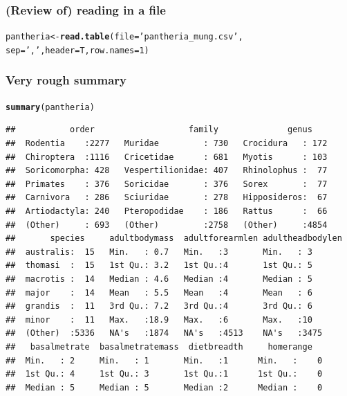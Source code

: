 \documentclass{beamer}\usepackage{graphicx, color}
\makeatletter
\newcommand{\hlfunctioncall}[1]{\textcolor[rgb]{0.501960784313725,0,0.329411764705882}{\textbf{#1}}}%
\newcommand{\hlstring}[1]{\textcolor[rgb]{0.6,0.6,1}{#1}}%
\newenvironment{kframe}{%
 \def\at@end@of@kframe{}%
 \ifinner\ifhmode%
  \def\at@end@of@kframe{\end{minipage}}%
  \begin{minipage}{\columnwidth}%
 \fi\fi%
 \def\FrameCommand##1{\hskip\@totalleftmargin \hskip-\fboxsep
 \colorbox{shadecolor}{##1}\hskip-\fboxsep
     \hskip-\linewidth \hskip-\@totalleftmargin \hskip\columnwidth}%
 \MakeFramed {\advance\hsize-\width
   \@totalleftmargin\z@ \linewidth\hsize
   \@setminipage}}%
 {\par\unskip\endMakeFramed%
 \at@end@of@kframe}
\newenvironment{knitrout}{}{} %
\makeatother
\begin{document}
\begin{frame}[fragile]
  \frametitle{(Review of) reading in a file}
\begin{knitrout}\scriptsize
{}\color{fgcolor}\begin{kframe}
\begin{alltt}
pantheria <- \hlfunctioncall{read.table}(file = \hlstring{'pantheria_mung.csv'}, 
                        sep = \hlstring{','}, header = T, row.names = 1)
\end{alltt}
\end{kframe}
\end{knitrout}

\end{frame}

\begin{frame}[fragile]
  \frametitle{Very rough summary}
\begin{knitrout}\scriptsize
{}\color{fgcolor}\begin{kframe}
\begin{alltt}
\hlfunctioncall{summary}(pantheria)
\end{alltt}
\begin{verbatim}
##           order                   family              genus     
##  Rodentia    :2277   Muridae         : 730   Crocidura   : 172  
##  Chiroptera  :1116   Cricetidae      : 681   Myotis      : 103  
##  Soricomorpha: 428   Vespertilionidae: 407   Rhinolophus :  77  
##  Primates    : 376   Soricidae       : 376   Sorex       :  77  
##  Carnivora   : 286   Sciuridae       : 278   Hipposideros:  67  
##  Artiodactyla: 240   Pteropodidae    : 186   Rattus      :  66  
##  (Other)     : 693   (Other)         :2758   (Other)     :4854  
##       species     adultbodymass  adultforearmlen adultheadbodylen
##  australis:  15   Min.   : 0.7   Min.   :3       Min.   : 3      
##  thomasi  :  15   1st Qu.: 3.2   1st Qu.:4       1st Qu.: 5      
##  macrotis :  14   Median : 4.6   Median :4       Median : 5      
##  major    :  14   Mean   : 5.5   Mean   :4       Mean   : 6      
##  grandis  :  11   3rd Qu.: 7.2   3rd Qu.:4       3rd Qu.: 6      
##  minor    :  11   Max.   :18.9   Max.   :6       Max.   :10      
##  (Other)  :5336   NA's   :1874   NA's   :4513    NA's   :3475    
##   basalmetrate  basalmetratemass  dietbreadth     homerange    
##  Min.   : 2     Min.   : 1       Min.   :1      Min.   :    0  
##  1st Qu.: 4     1st Qu.: 3       1st Qu.:1      1st Qu.:    0  
##  Median : 5     Median : 5       Median :2      Median :    0  

\end{verbatim}
\end{kframe}
\end{knitrout}
\end{frame}
\end{document}
